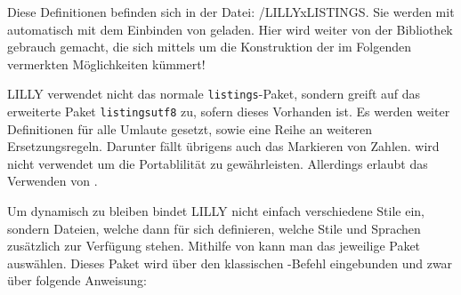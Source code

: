 Diese Definitionen befinden sich in der Datei: {\ltt{}/LILLYxLISTINGS}. Sie werden mit  automatisch mit dem Einbinden von  geladen.\medskip\newline
Hier wird weiter von der Bibliothek  gebrauch gemacht, die sich mittels  um die Konstruktion der im Folgenden vermerkten Möglichkeiten kümmert!
\begin{bemerkung}
    LILLY verwendet nicht das normale \verb|listings|-Paket, sondern greift auf das erweiterte Paket \verb|listingsutf8| zu, sofern dieses Vorhanden ist. Es werden weiter Definitionen für alle Umlaute gesetzt, sowie eine Reihe an weiteren Ersetzungsregeln. Darunter fällt übrigens auch das Markieren von Zahlen.  wird nicht verwendet um die Portablilität zu gewährleisten. Allerdings erlaubt  das Verwenden von .
\end{bemerkung}
Um dynamisch zu bleiben bindet LILLY nicht einfach verschiedene Stile ein, sondern Dateien, welche dann für sich definieren, welche Stile und Sprachen zusätzlich zur Verfügung stehen. %
Mithilfe von  kann man das jeweilige Paket auswählen. Dieses Paket wird über den klassischen -Befehl eingebunden und zwar über folgende Anweisung:
{\small\begin{latex}

\end{latex}}

